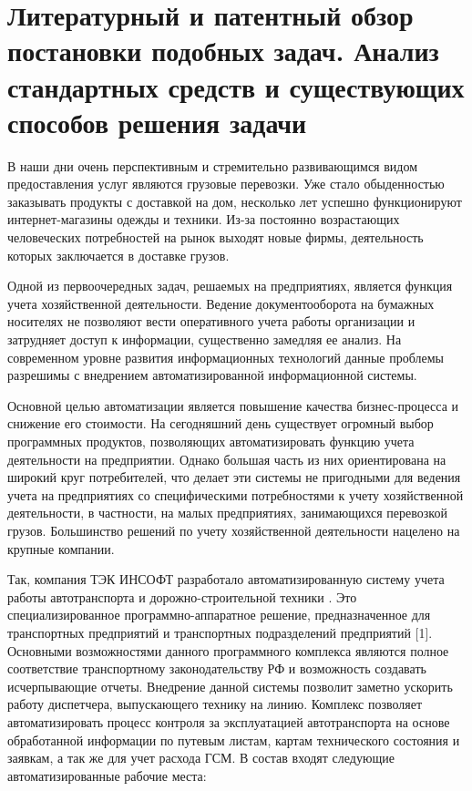 \documentclass[../nirs.tex]{subfiles}
\begin{document}
\section{Литературный и патентный обзор постановки подобных задач.
Анализ стандартных средств и существующих способов решения задачи}

В наши дни очень перспективным и стремительно развивающимся видом предоставления
услуг являются грузовые перевозки.
Уже стало обыденностью заказывать продукты с доставкой на дом, несколько лет
успешно функционируют интернет-магазины одежды и техники.
Из-за постоянно возрастающих человеческих потребностей на рынок выходят новые
фирмы, деятельность которых заключается в доставке грузов.

Одной из первоочередных задач, решаемых на предприятиях, является функция
учета хозяйственной деятельности.
Ведение документооборота на бумажных носителях не позволяют вести оперативного
учета работы организации и затрудняет доступ к информации, существенно замедляя
ее анализ.
На современном уровне развития информационных технологий данные проблемы
разрешимы с внедрением автоматизированной информационной системы.

Основной целью автоматизации является повышение качества бизнес-процесса и
снижение его стоимости.
На сегодняшний день существует огромный выбор программных продуктов, позволяющих
автоматизировать функцию учета деятельности на предприятии.
Однако большая часть из них ориентирована на широкий круг потребителей, что
делает эти системы не пригодными для ведения учета на предприятиях со
специфическими потребностями к учету хозяйственной деятельности,
в частности, на малых предприятиях, занимающихся перевозкой грузов.
Большинство решений по учету хозяйственной деятельности нацелено на крупные
компании.

Так, компания ТЭК ИНСОФТ разработало автоматизированную систему учета работы
автотранспорта и дорожно-строительной техники . Это специализированное
программно-аппаратное решение, предназначенное для транспортных предприятий и
транспортных подразделений предприятий [1].
Основными возможностями данного программного комплекса являются полное
соответствие транспортному законодательству РФ и возможность создавать
исчерпывающие отчеты.
Внедрение данной системы позволит заметно ускорить работу диспетчера,
выпускающего технику на линию.
Комплекс позволяет автоматизировать процесс контроля за эксплуатацией
автотранспорта на основе обработанной информации по путевым листам, картам
технического состояния и заявкам, а так же для учет расхода ГСМ.
В состав  входят следующие автоматизированные рабочие места:
\end{document}
